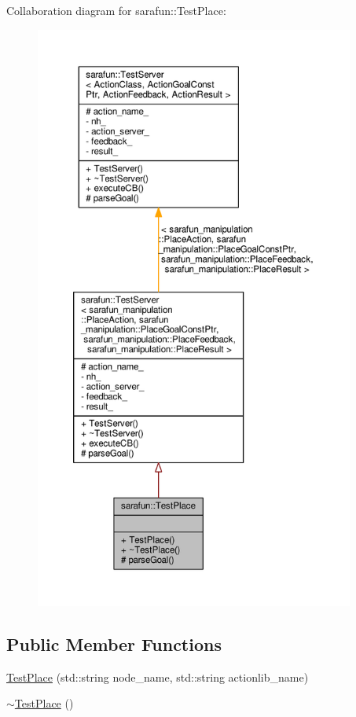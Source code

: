 Collaboration diagram for sarafun\-:\-:Test\-Place\-:\nopagebreak
\begin{figure}[H]
\begin{center}
\leavevmode
\includegraphics[height=550pt]{dc/d88/classsarafun_1_1TestPlace__coll__graph}
\end{center}
\end{figure}
\subsection*{Public Member Functions}
\begin{DoxyCompactItemize}
\item 
\hyperlink{classsarafun_1_1TestPlace_a9f6925f4f93b3430e1687ed37999be59_a9f6925f4f93b3430e1687ed37999be59}{Test\-Place} (std\-::string node\-\_\-name, std\-::string actionlib\-\_\-name)
\item 
\hyperlink{classsarafun_1_1TestPlace_a419a921ef99346f693e1b661b5f668b7_a419a921ef99346f693e1b661b5f668b7}{$\sim$\-Test\-Place} ()
\end{DoxyCompactItemize}

